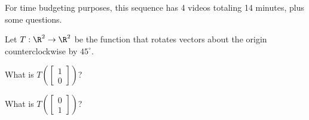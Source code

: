 




For time budgeting purposes, this sequence has 4 videos totaling 14 minutes, 
plus some questions.  



\endedxtext

\endedxvertical






Let $T: \R^2 \rightarrow \R^2$ be the function that rotates vectors about the origin counterclockwise by
$45^\circ$.  

What is  $T\left( \left[\begin{array}{c}
1 \\
0 
\end{array} \right] \right)$?  




\endedxproblem



What is $T\left( \left[\begin{array}{c}
0 \\
1 
\end{array} \right] \right)$?  


\endedxproblem


\endedxvertical









